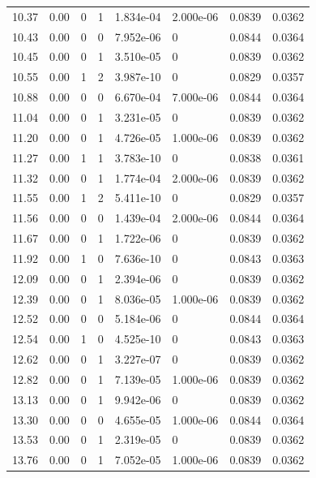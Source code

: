 \documentclass[preview]{standalone}
\begin{document}
{{{\begin{tabular}{L{1.2cm}C{1.2cm} C{0.3cm}C{0.5cm} C{1.4cm}C{1.4cm} C{1.4cm}C{1.4cm}}
  10.37  &  0.00  & 0     &  1 &  1.834e-04  & 2.000e-06  & 0.0839 &  0.0362   \\ 
  10.43  &  0.00  & 0     &  0 &  7.952e-06  & 0  & 0.0844 &  0.0364   \\ 
  10.45  &  0.00  & 0     &  1 &  3.510e-05  & 0  & 0.0839 &  0.0362   \\ 
  10.55  &  0.00  & 1     &  2 &  3.987e-10  & 0  & 0.0829 &  0.0357   \\ 
  10.88  &  0.00  & 0     &  0 &  6.670e-04  & 7.000e-06  & 0.0844 &  0.0364   \\ 
  11.04  &  0.00  & 0     &  1 &  3.231e-05  & 0  & 0.0839 &  0.0362   \\ 
  11.20  &  0.00  & 0     &  1 &  4.726e-05  & 1.000e-06  & 0.0839 &  0.0362   \\ 
  11.27  &  0.00  & 1     &  1 &  3.783e-10  & 0  & 0.0838 &  0.0361   \\ 
  11.32  &  0.00  & 0     &  1 &  1.774e-04  & 2.000e-06  & 0.0839 &  0.0362   \\ 
  11.55  &  0.00  & 1     &  2 &  5.411e-10  & 0  & 0.0829 &  0.0357   \\ 
  11.56  &  0.00  & 0     &  0 &  1.439e-04  & 2.000e-06  & 0.0844 &  0.0364   \\ 
  11.67  &  0.00  & 0     &  1 &  1.722e-06  & 0  & 0.0839 &  0.0362   \\ 
  11.92  &  0.00  & 1     &  0 &  7.636e-10  & 0  & 0.0843 &  0.0363   \\ 
  12.09  &  0.00  & 0     &  1 &  2.394e-06  & 0  & 0.0839 &  0.0362   \\ 
  12.39  &  0.00  & 0     &  1 &  8.036e-05  & 1.000e-06  & 0.0839 &  0.0362   \\ 
  12.52  &  0.00  & 0     &  0 &  5.184e-06  & 0  & 0.0844 &  0.0364   \\ 
  12.54  &  0.00  & 1     &  0 &  4.525e-10  & 0  & 0.0843 &  0.0363   \\ 
  12.62  &  0.00  & 0     &  1 &  3.227e-07  & 0  & 0.0839 &  0.0362   \\ 
  12.82  &  0.00  & 0     &  1 &  7.139e-05  & 1.000e-06  & 0.0839 &  0.0362   \\ 
  13.13  &  0.00  & 0     &  1 &  9.942e-06  & 0  & 0.0839 &  0.0362   \\ 
  13.30  &  0.00  & 0     &  0 &  4.655e-05  & 1.000e-06  & 0.0844 &  0.0364   \\ 
  13.53  &  0.00  & 0     &  1 &  2.319e-05  & 0  & 0.0839 &  0.0362   \\ 
  13.76  &  0.00  & 0     &  1 &  7.052e-05  & 1.000e-06  & 0.0839 &  0.0362   \\ 

\end{tabular}}}}
\end{document}
